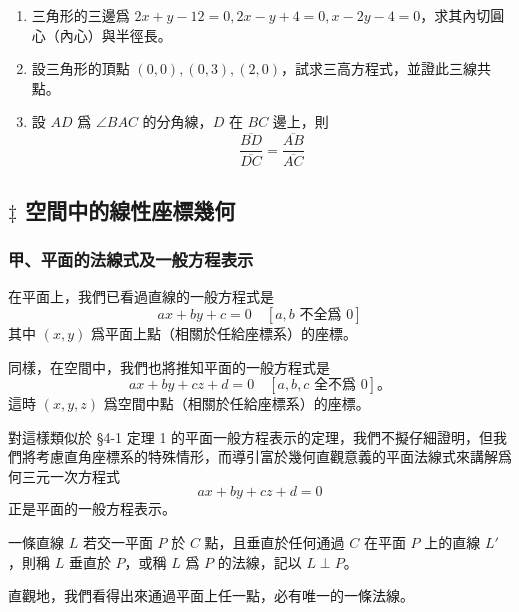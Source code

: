 \begin{enumerate}
\begin{figure}[H]
  \caption{四邊形中點聯成平行四邊形}
  \label{fig:4-64}
  \end{figure}

\item 三角形的三邊爲 $2x + y - 12 = 0, 2x - y + 4 = 0, x - 2y - 4 = 0$，求其內切圓心（內心）與半徑長。

\item 設三角形的頂點 $(0, 0), (0, 3), (2, 0)$，試求三高方程式，並證此三線共點。

\item 設 $AD$ 爲 $\angle BAC$ 的分角線，$D$ 在 $BC$ 邊上，則
\[
\frac{\overline{BD}}{\overline{DC}} = \frac{\overline{AB}}{\overline{AC}}
\]
\end{enumerate}


\subsection{\texorpdfstring{$\ddagger$ }{‡ }空間中的線性座標幾何}
\label{sec:4-8}

\subsubsection*{甲、平面的法線式及一般方程表示}

在平面上，我們已看過直線的一般方程式是
\[
ax + by + c = 0 \quad [a, b \text{ 不全爲 } 0]
\]
其中 $(x, y)$ 爲平面上點（相關於任給座標系）的座標。

同樣，在空間中，我們也將推知平面的一般方程式是
\begin{equation}
ax + by + cz + d = 0 \quad [a, b, c \text{ 全不爲 } 0]\text{。}
\label{eq:b3s-4-44}
\end{equation}
這時 $(x, y, z)$ 爲空間中點（相關於任給座標系）的座標。

對這樣類似於 \S 4-1 定理 1 的平面一般方程表示的定理，我們不擬仔細證明，但我們將考慮直角座標系的特殊情形，而導引富於幾何直觀意義的平面法線式來講解爲何三元一次方程式
\[
ax + by + cz + d = 0
\]
正是平面的一般方程表示。

\begin{definition}
一條直線 $L$ 若交一平面 $P$ 於 $C$ 點，且垂直於任何通過 $C$ 在平面 $P$ 上的直線 $L'$，則稱 $L$ 垂直於 $P$，或稱 $L$ 爲 $P$ 的法線，記以 $L \perp P$。
\end{definition}

直觀地，我們看得出來通過平面上任一點，必有唯一的一條法線。

